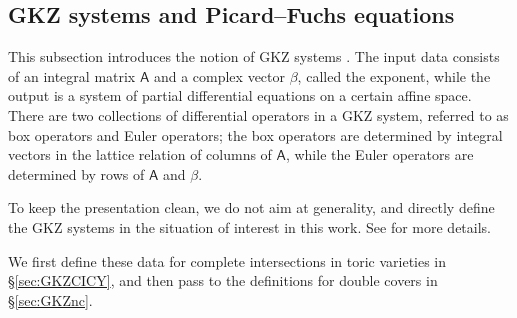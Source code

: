 \documentclass[12pt,a4paper,oneside]{amsart}
\numberwithin{equation}{section}
\theoremstyle{definition}
\theoremstyle{remark}
\begin{document}
\subsection{GKZ systems and Picard--Fuchs equations}
\label{sec:GKZdef}
This subsection introduces the notion of GKZ systems \cite{Gelfand:1990bua}. 
The input data consists of an integral matrix $\mathsf{A}$ and a complex vector \(\beta\), called the exponent, while the output is a system of
partial differential equations on a certain affine space.
There are two collections of differential operators in a GKZ system, 
referred to as box operators and Euler operators; the box operators are determined by 
integral vectors in the lattice relation of columns of $\mathsf{A}$, 
while the Euler operators are determined by rows of $\mathsf{A}$ 
and $\beta$.\par

To keep the presentation clean, we do not aim at generality, and directly define the GKZ systems in the situation of interest in this work. See \cite{Gelfand:1994,Hosono:1995bm} for more details.\par
We first define these data for complete intersections in toric varieties in \S\ref{sec:GKZCICY}, 
and then pass to the definitions for double covers in \S\ref{sec:GKZnc}.\par
\end{document}
